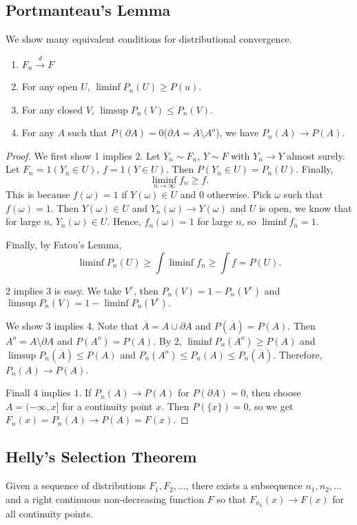 \documentclass[11pt]{scrartcl}
\begin{document}
\subsection{Portmanteau's Lemma}
We show many equivalent conditions for distributional convergence.
\begin{enumerate}
\item $F_n \xrightarrow{d} F$ 
\item For any open $U$, $\liminf P_n(U) \ge P(u)$.
\item For any closed $V$, $\limsup P_n(V) \le P_n(V)$.
\item For any $A$ such that $P(\partial A) = 0$($\partial A = \overline{A}\setminus A^o$), we have $P_n(A) \rightarrow P(A)$.
\end{enumerate}
\begin{proof}
We first show 1 implies 2.  Let $Y_n \sim F_n$, $Y \sim F$ with $Y_n \rightarrow Y$ almost surely.  Let $F_n = 1(Y_n \in U)$, $f = 1(Y \in U)$.  Then $P(Y_n \in U) = P_n(U)$.  Finally, $$\liminf_{n \rightarrow \infty} f_n \ge f.$$
This is because $f(\omega) = 1$ if $Y (\omega) \in U$ and $0$ otherwise.  Pick $\omega$ such that $f(\omega) = 1$.  Then $Y(\omega) \in U$ and $Y_n(\omega) \rightarrow Y(\omega)$ and $U$ is open, we know that for large $n$, $Y_n(\omega) \in U$.  Hence, $f_n(\omega) = 1$ for large $n$, so $\liminf f_n = 1$.  

Finally, by Fatou's Lemma, 
$$\liminf P_n(U) \ge \int \liminf f_n \ge \int f = P(U).$$

2 implies 3 is easy.  We take $V^c$, then $P_n(V) = 1 - P_n(V^c)$ and $\limsup P_n(V) = 1 - \liminf P_n(V^c).$

We show 3 implies 4.  Note that $\overline A = A \cup \partial A$ and $P(\overline A) = P(A)$.  Then $A^o = A \setminus \partial A$ and $P(A^o) = P(A)$.  By 2, $\liminf P_n(A^o) \ge P(A)$ and $\limsup P_n(\overline A) \le P(A)$ and $P_n(A^o) \le P_n(A) \le P_n(\overline A)$.  Therefore, $P_n(A) \rightarrow P(A)$.

Finall 4 implies 1.  If $P_n(A) \rightarrow P(A)$ for $P(\partial A) = 0$, then choose $A = (-\infty, x]$ for a continuity point $x$.  Then $P(\{x\}) = 0$, so we get $F_n(x) = P_n(A) \rightarrow P(A) = F(x)$.
\end{proof}
\subsection{Helly's Selection Theorem} 
\begin{thm}Given a sequence of distributions $F_1, F_2, \dots$, there exists a subsequence $n_1, n_2, \dots$ and a right continuous non-decreasing function $F$ so that $F_{n_k}(x) \rightarrow F(x)$ for all continuity points.   
\end{thm}
\end{document}
